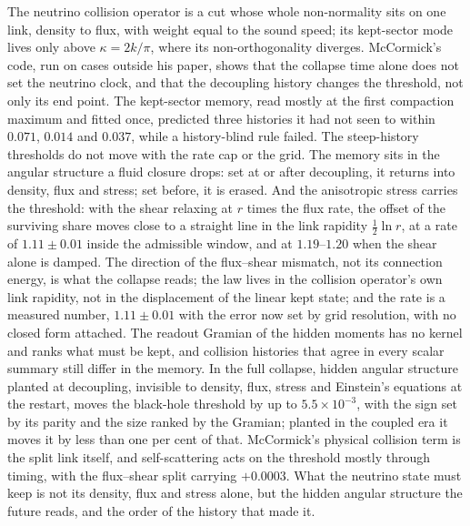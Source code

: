 \documentclass[11pt]{article}
\begin{document}
The neutrino collision operator is a cut whose whole non-normality sits on one link, density to flux, with weight equal to the sound speed; its kept-sector mode lives only above $\kappa=2k/\pi$, where its non-orthogonality diverges. McCormick's code, run on cases outside his paper, shows that the collapse time alone does not set the neutrino clock, and that the decoupling history changes the threshold, not only its end point. The kept-sector memory, read mostly at the first compaction maximum and fitted once, predicted three histories it had not seen to within $0.071$, $0.014$ and $0.037$, while a history-blind rule failed. The steep-history thresholds do not move with the rate cap or the grid. The memory sits in the angular structure a fluid closure drops: set at or after decoupling, it returns into density, flux and stress; set before, it is erased. And the anisotropic stress carries the threshold: with the shear relaxing at $r$ times the flux rate, the offset of the surviving share moves close to a straight line in the link rapidity $\tfrac12\ln r$, at a rate of $1.11\pm0.01$ inside the admissible window, and at $1.19$--$1.20$ when the shear alone is damped. The direction of the flux--shear mismatch, not its connection energy, is what the collapse reads; the law lives in the collision operator's own link rapidity, not in the displacement of the linear kept state; and the rate is a measured number, $1.11\pm0.01$ with the error now set by grid resolution, with no closed form attached. The readout Gramian of the hidden moments has no kernel and ranks what must be kept, and collision histories that agree in every scalar summary still differ in the memory. In the full collapse, hidden angular structure planted at decoupling, invisible to density, flux, stress and Einstein's equations at the restart, moves the black-hole threshold by up to $5.5\times10^{-3}$, with the sign set by its parity and the size ranked by the Gramian; planted in the coupled era it moves it by less than one per cent of that. McCormick's physical collision term is the split link itself, and self-scattering acts on the threshold mostly through timing, with the flux--shear split carrying $+0.0003$. What the neutrino state must keep is not its density, flux and stress alone, but the hidden angular structure the future reads, and the order of the history that made it.
\end{document}
